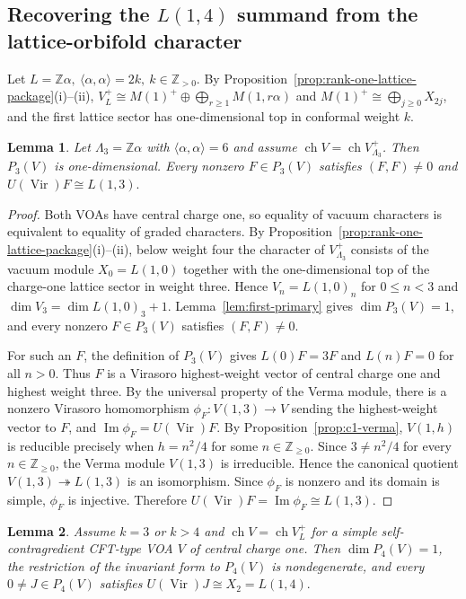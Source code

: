 \documentclass[12pt,leqno]{amsart}
\numberwithin{equation}{section} \newtheorem{thm}{Theorem}[section] \newtheorem{lem}[thm]{Lemma} \newtheorem{ex}[thm]{Example} \newtheorem{prop}[thm]{Proposition} \newtheorem{cor}[thm]{Corollary} \newtheorem{defi}[thm]{Definition} \newtheorem{rmk}[thm]{Remark} \newtheorem{notation}[thm]{Notation}
\newcommand{\Vir}{\operatorname{Vir}}
\newcommand{\ch}{\operatorname{ch}}
\def\Z{\mathbb{Z}} \def\N{\mathbb{N}} \def\A{\mathbb{A}} \def\C{\mathbb{C}} \def\R{\mathbb{R}} \def\Q{\mathbb{Q}} \def\F{\mathbb{F}}
\begin{document}
\subsection{Recovering the \texorpdfstring{$L(1,4)$}{L(1,4)} summand from the lattice-orbifold character}

Let \(L=\Z\alpha,\ \langle\alpha,\alpha\rangle=2k,\ k\in\Z_{>0}\). By Proposition~\ref{prop:rank-one-lattice-package}(i)--(ii), \(V_L^+\cong M(1)^+\oplus\bigoplus_{r\ge1}M(1,r\alpha)\) and \(M(1)^+\cong\bigoplus_{j\ge0}X_{2j}\), and the first lattice sector has one-dimensional top in conformal weight $k$.

\begin{lem}\label{lem:k3-weight3}
Let $\Lambda_3=\Z\alpha$ with $\langle\alpha,\alpha\rangle=6$ and assume $\ch V=\ch V_{\Lambda_3}^+$. Then $P_3(V)$ is one-dimensional. Every nonzero $F\in P_3(V)$ satisfies \((F,F)\ne0\) and \(U(\Vir)F\cong L(1,3).\)
\end{lem}

\begin{proof}
Both VOAs have central charge one, so equality of vacuum characters is equivalent to equality of graded characters. By Proposition~\ref{prop:rank-one-lattice-package}(i)--(ii), below weight four the character of $V_{\Lambda_3}^+$ consists of the vacuum module $X_0=L(1,0)$ together with the one-dimensional top of the charge-one lattice sector in weight three. Hence $V_n=L(1,0)_n$ for $0\le n<3$ and $\dim V_3=\dim L(1,0)_3+1$. Lemma~\ref{lem:first-primary} gives $\dim P_3(V)=1$, and every nonzero $F\in P_3(V)$ satisfies $(F,F)\ne0$.

For such an $F$, the definition of $P_3(V)$ gives \(L(0)F=3F\) and \(L(n)F=0\) for all $n>0$. Thus $F$ is a Virasoro highest-weight vector of central charge one and highest weight three. By the universal property of the Verma module, there is a nonzero Virasoro homomorphism \(\phi_F:V(1,3)\longrightarrow V\) sending the highest-weight vector to $F$, and \(\operatorname{Im}\phi_F=U(\Vir)F.\) By Proposition~\ref{prop:c1-verma}, $V(1,h)$ is reducible precisely when \(h=n^2/4\) for some $n\in\Z_{\ge0}$. Since \(3\ne n^2/4\) for every $n\in\Z_{\ge0}$, the Verma module $V(1,3)$ is irreducible. Hence the canonical quotient \(V(1,3)\twoheadrightarrow L(1,3)\) is an isomorphism. Since $\phi_F$ is nonzero and its domain is simple, $\phi_F$ is injective. Therefore \(U(\Vir)F=\operatorname{Im}\phi_F\cong L(1,3).\)
\end{proof}

\begin{lem}\label{lem:intervening}
Assume $k=3$ or $k>4$ and \(\ch V=\ch V_L^+\) for a simple self-contragredient CFT-type VOA $V$ of central charge one. Then \(\dim P_4(V)=1\), the restriction of the invariant form to \(P_4(V)\) is nondegenerate, and every \(0\ne J\in P_4(V)\) satisfies \(U(\Vir)J\cong X_2=L(1,4).\)
\end{lem}
\end{document}
